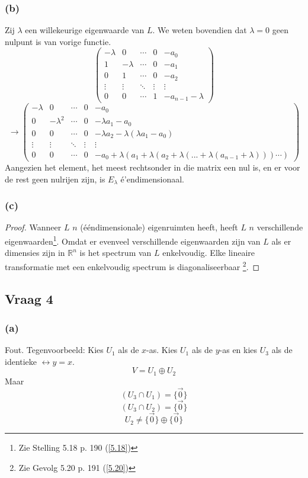 \documentclass[lineaire_algebra_oplossingen.tex]{subfiles}
\begin{document}
\subsubsection*{(b)}
Zij $\lambda$ een willekeurige eigenwaarde van $L$. We weten bovendien dat $\lambda = 0$ geen nulpunt is van vorige functie.
\[
\begin{pmatrix}
-\lambda & 0 & \cdots & 0 & -a_0\\
1 & -\lambda & \cdots & 0 & -a_1\\
0 & 1 & \cdots & 0 & -a_2\\
\vdots & \vdots & \ddots & \vdots & \vdots\\
0 & 0 & \cdots & 1 & -a_{n-1}-\lambda
\end{pmatrix}
\]
\[
\rightarrow
\begin{pmatrix}
-\lambda & 0 & \cdots & 0 & -a_0\\
0 & -\lambda^2 & \cdots & 0 & -\lambda a_1-a_0\\
0 & 0 & \cdots & 0 & -\lambda a_2-\lambda(\lambda a_1-a_0)\\
\vdots & \vdots & \ddots & \vdots & \vdots\\
0 & 0 & \cdots & 0 & -a_0 + \lambda(a_1 + \lambda(a_2 + \lambda(... + \lambda(a_{n-1} + \lambda)))\cdots)
\end{pmatrix}
\]
Aangezien het element, het meest rechtsonder in die matrix een nul is, en er voor de rest geen nulrijen zijn, is $E_\lambda$ \'e'endimensionaal.

\subsubsection*{(c)}
\begin{proof}
Wanneer $L$ $n$ (\'e\'endimensionale) eigenruimten heeft, heeft $L$ $n$ verschillende eigenwaarden\footnote{Zie Stelling 5.18 p. 190 (\ref{5.18})}. Omdat er evenveel verschillende eigenwaarden zijn van $L$ als er dimensies zijn in $\mathbb{R}^n$ is het spectrum van $L$ enkelvoudig. Elke lineaire transformatie met een enkelvoudig spectrum is diagonaliseerbaar \footnote{Zie Gevolg 5.20 p. 191 (\ref{5.20})}.
\end{proof}

\subsection{Vraag 4}
\subsubsection*{(a)}
Fout. Tegenvoorbeeld:
Kies $U_1$ als de $x$-as. Kies $U_1$ als de $y$-as en kies $U_3$ als de identieke $\leftrightarrow y=x$.
\[
V = U_1 \oplus U_2
\]
Maar
\[
(U_3 \cap U_1) = \{\vec{0}\}
\]
\[
(U_3 \cap U_2) = \{\vec{0}\}
\]
\[
U_2 \neq \{\vec{0}\} \oplus \{\vec{0}\}
\]
\end{document}

